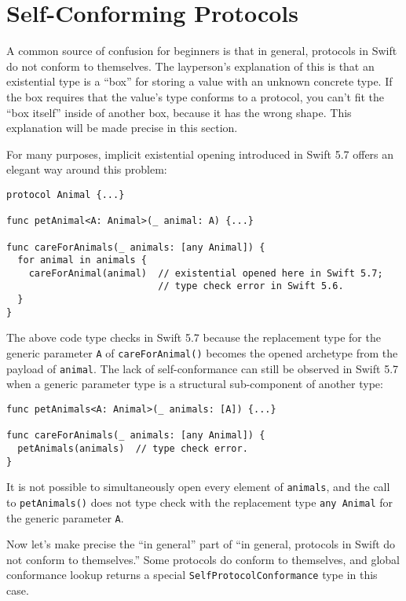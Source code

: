 \documentclass[a4paper,headsepline,bibliography=totoc,toc=flat,fleqn,twoside=semi]{scrbook}
\theoremstyle{definition}
\theoremstyle{definition}
\theoremstyle{definition}
\newcommand{\ifWIP}{\iffalse}
\begin{document}
\section{Self-Conforming Protocols}\label{selfconformingprotocols}

\ifWIP
A common source of confusion for beginners is that in general, protocols in Swift do not conform to themselves. The layperson's explanation of this is that an existential type is a ``box'' for storing a value with an unknown concrete type. If the box requires that the value's type conforms to a protocol, you can't fit the ``box itself'' inside of another box, because it has the wrong shape. This explanation will be made precise in this section.

For many purposes, implicit existential opening introduced in Swift 5.7 \cite{se0352} offers an elegant way around this problem:
\begin{Verbatim}
protocol Animal {...}

func petAnimal<A: Animal>(_ animal: A) {...}

func careForAnimals(_ animals: [any Animal]) {
  for animal in animals {
    careForAnimal(animal)  // existential opened here in Swift 5.7;
                           // type check error in Swift 5.6.
  }
}
\end{Verbatim}
The above code type checks in Swift 5.7 because the replacement type for the generic parameter \texttt{A} of \texttt{careForAnimal()} becomes the opened archetype from the payload of \texttt{animal}. The lack of self-conformance can still be observed in Swift 5.7 when a generic parameter type is a structural sub-component of another type:
\begin{Verbatim}
func petAnimals<A: Animal>(_ animals: [A]) {...}

func careForAnimals(_ animals: [any Animal]) {
  petAnimals(animals)  // type check error.
}
\end{Verbatim}
It is not possible to simultaneously open every element of \texttt{animals}, and the call to \texttt{petAnimals()} does not type check with the replacement type \texttt{any Animal} for the generic parameter \texttt{A}.

Now let's make precise the ``in general'' part of ``in general, protocols in Swift do not conform to themselves.'' Some protocols do conform to themselves, and global conformance lookup returns a special \texttt{SelfProtocolConformance} type in this case.
\end{document}
